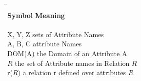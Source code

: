     
\begin{symbolindex}

{\renewcommand{\baselinestretch}{1}
\small\normalsize
\begin{tabbing}
\hspace*{4cm}\=\kill \\
{\bf Symbol} \>        {\bf Meaning}\\
\\
X, Y, Z \> 		 sets of Attribute Names\\
A, B, C \> 		 attribute Names\\
DOM(A) \>  		 the Domain of an Attribute A\\
$R$ \>   		 the set of Attribute names in Relation $R$ \\
r($R$) \>  	         a relation r defined over attributes $R$ \\


\end{tabbing}}
\end{symbolindex}
